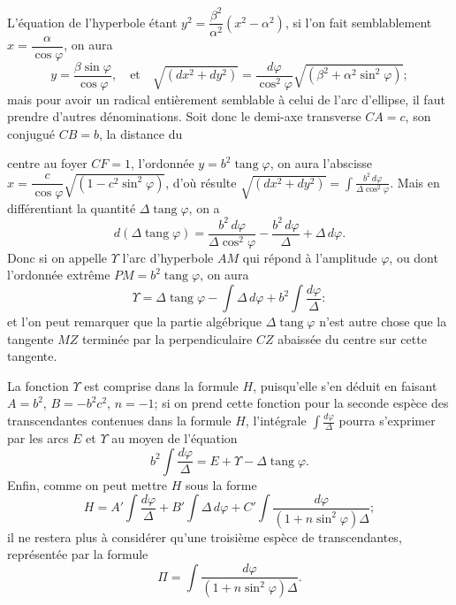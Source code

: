 \documentclass{article}
\begin{document}

L'équation de l'hyperbole étant $y^{2}=\dfrac{\beta^{2}}{\alpha^{2}}(x^{2}-\alpha^{2})$, si l'on fait semblablement $x=\dfrac{\alpha}{\cos\varphi}$, on aura
\[ y=\frac{\beta\sin\varphi}{\cos\varphi},\quad\text{et}\quad\sqrt{(dx^{2}+dy^{2})}=\frac{d\varphi}{\cos^{2}\varphi}\sqrt{(\beta^{2}+\alpha^{2}\sin^{2}\varphi)}; \]
mais pour avoir un radical entièrement semblable à celui de l'arc d'ellipse, il faut prendre d'autres dénominations. Soit donc le demi-axe transverse $CA=c$, son conjugué $CB=b$, la distance du

centre au foyer $CF=1$, l'ordonnée $y=b^{2}\operatorname{tang}\varphi$, on aura l'abscisse $x=\dfrac{c}{\cos\varphi}\sqrt{(1-c^{2}\sin^{2}\varphi)}$, d'où résulte $\sqrt{(dx^{2}+dy^{2})}=\displaystyle\int\frac{b^{2}\,d\varphi}{\Delta\cos^{2}\varphi}$. Mais en différentiant la quantité $\Delta\operatorname{tang}\varphi$, on a
\[ d(\Delta\operatorname{tang}\varphi)=\frac{b^{2}\,d\varphi}{\Delta\cos^{2}\varphi}-\frac{b^{2}\,d\varphi}{\Delta}+\Delta\,d\varphi. \]
Donc si on appelle $\Upsilon$ l'arc d'hyperbole $AM$ qui répond à l'amplitude $\varphi$, ou dont l'ordonnée extrême $PM=b^{2}\operatorname{tang}\varphi$, on aura
\[ \Upsilon=\Delta\operatorname{tang}\varphi-\int\Delta\,d\varphi+b^{2}\int\frac{d\varphi}{\Delta}: \]
et l'on peut remarquer que la partie algébrique $\Delta\operatorname{tang}\varphi$ n'est autre chose que la tangente $MZ$ terminée par la perpendiculaire $CZ$ abaissée du centre sur cette tangente.

La fonction $\Upsilon$ est comprise dans la formule $H$, puisqu'elle s'en déduit en faisant $A=b^{2}$, $B=-b^{2}c^{2}$, $n=-1$; si on prend cette fonction pour la seconde espèce des transcendantes contenues dans la formule $H$, l'intégrale $\displaystyle\int\frac{d\varphi}{\Delta}$ pourra s'exprimer par les arcs $E$ et $\Upsilon$ au moyen de l'équation
\[ b^{2}\int\frac{d\varphi}{\Delta}=E+\Upsilon-\Delta\operatorname{tang}\varphi. \]
Enfin, comme on peut mettre $H$ sous la forme
\[ H=A'\int\frac{d\varphi}{\Delta}+B'\int\Delta\,d\varphi+C'\int\frac{d\varphi}{(1+n\sin^{2}\varphi)\Delta}; \]
il ne restera plus à considérer qu'une troisième espèce de transcendantes, représentée par la formule
\[ \Pi=\int\frac{d\varphi}{(1+n\sin^{2}\varphi)\Delta}. \]
\end{document}
